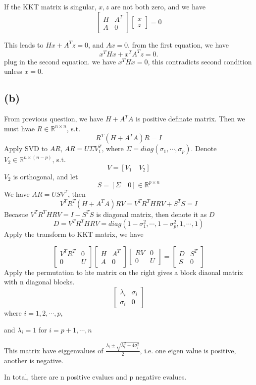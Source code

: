 \documentclass[11pt]{article}
\begin{document}
If the KKT matrix is singular, \(x,z\) are not both zero, and we have \[
\begin{bmatrix}
H & A^T\\
A & 0
\end{bmatrix}
\begin{bmatrix}
x\\
z
\end{bmatrix} = 0\]

This leads to \(Hx + A^Tz = 0\), and \(Ax = 0\). from the first
equation, we have \[
x^THx + x^TA^Tz = 0.
\] plug in the second equation. we have \(x^THx = 0\), this contradicts
second condition unless \(x= 0\).

\subsection{(b)}\label{b}

From previous question, we have \(H + A^TA\) is positive definate
matrix. Then we must hvae \(R \in \mathbb R^{n\times n}\), s.t. \[
R^T(H + A^TA)R = I
\] Apply SVD to \(AR\), \(AR = U\Sigma V_1^T\), where
\(\Sigma = diag(\sigma_1,\cdots, \sigma_p)\). Denote
\(V_2 \in \mathbb R^{n\times(n-p)}\), s.t. \[
V = \left[V_1\quad V_2\right]
\] \(V_2\) is orthogonal, and let \[
S = \left[\Sigma\quad 0\right] \in \mathbb R^{p\times n}
\] We have \(AR = USV^T\), then \[
V^TR^T(H + A^TA)RV = V^TR^THRV + S^TS = I
\] Becasue \(V^TR^THRV = I - S^TS\) is diagonal matrix, then denote it
as \(D\) \[
D = V^TR^THRV = diag(1-\sigma_1^2, \cdots, 1-\sigma_p^2, 1, \cdots, 1)
\] Apply the transform to KKT matrix, we have

\[
\begin{bmatrix}
V^TR^T & 0\\
0 & U
\end{bmatrix}
\begin{bmatrix}
H & A^T\\
A & 0
\end{bmatrix}
\begin{bmatrix}
RV & 0\\
0 & U
\end{bmatrix}
=
\begin{bmatrix}
D & S^T\\
S & 0
\end{bmatrix}
\] Apply the permutation to hte matrix on the right gives a block
diaonal matrix with n diagonal blocks. \[
\begin{bmatrix}
\lambda_i & \sigma_i\\
\sigma_i & 0
\end{bmatrix}
\] where \(i = 1,2,\cdots, p\),

and \(\lambda_i = 1\) for \(i = p +1, \cdots, n\)

This matrix have eiggenvalues of
\(\frac{\lambda_i \pm \sqrt{\lambda_i^2 + 4\sigma_i^2}}{2}\), i.e. one
eigen value is positive, another is negative.

In total, there are n positive evalues and p negative evalues.


    
    
    
    
\end{document}
